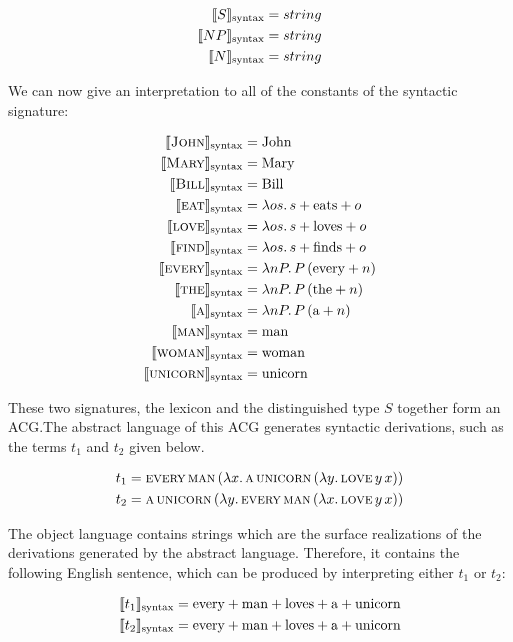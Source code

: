 \begin{align*}
  \llbracket S \rrbracket_{\text{syntax}} &= string \\
  \llbracket NP \rrbracket_{\text{syntax}} &= string \\
  \llbracket N \rrbracket_{\text{syntax}} &= string
\end{align*}

We can now give an interpretation to all of the constants of the syntactic
signature:

\begin{align*}
  \llbracket \textsc{John} \rrbracket_{\text{syntax}} &= \text{John} \\
  \llbracket \textsc{Mary} \rrbracket_{\text{syntax}} &= \text{Mary} \\
  \llbracket \textsc{Bill} \rrbracket_{\text{syntax}} &= \text{Bill} \\
  \llbracket \textsc{eat} \rrbracket_{\text{syntax}} &= \lambda o s.\, s + \text{eats} + o \\
  \llbracket \textsc{love} \rrbracket_{\text{syntax}} &= \lambda o s.\, s + \text{loves} + o \\
  \llbracket \textsc{find} \rrbracket_{\text{syntax}} &= \lambda o s.\, s + \text{finds} + o \\
  \llbracket \textsc{every} \rrbracket_{\text{syntax}} &= \lambda n P.\, P\,(\text{every} + n) \\
  \llbracket \textsc{the} \rrbracket_{\text{syntax}} &= \lambda n P.\, P\,(\text{the} + n) \\
  \llbracket \textsc{a} \rrbracket_{\text{syntax}} &= \lambda n P.\, P\,(\text{a} + n) \\
  \llbracket \textsc{man} \rrbracket_{\text{syntax}} &= \text{man} \\
  \llbracket \textsc{woman} \rrbracket_{\text{syntax}} &= \text{woman} \\
  \llbracket \textsc{unicorn} \rrbracket_{\text{syntax}} &= \text{unicorn}
\end{align*}

These two signatures, the lexicon and the distinguished type $S$ together
form an ACG.\@ The abstract language of this ACG generates syntactic
derivations, such as the terms $t_1$ and $t_2$ given below.

\begin{align*}
  &t_1 = \textsc{every}\,\textsc{man}\,(\lambda x.\, \textsc{a}\,\textsc{unicorn}\,(\lambda y.\, \textsc{love}\,y\,x)) \\
  &t_2 = \textsc{a}\,\textsc{unicorn}\,(\lambda y.\, \textsc{every}\,\textsc{man}\,(\lambda x.\, \textsc{love}\,y\,x))
\end{align*}

The object language contains strings which are the surface realizations of
the derivations generated by the abstract language. Therefore, it contains
the following English sentence, which can be produced by interpreting
either $t_1$ or $t_2$:

\begin{align*}
  &\llbracket t_1 \rrbracket_{\text{syntax}} = \text{every} + \text{man} + \text{loves} + \text{a} + \text{unicorn} \\
  &\llbracket t_2 \rrbracket_{\text{syntax}} = \text{every} + \text{man} + \text{loves} + \text{a} + \text{unicorn}
\end{align*}

